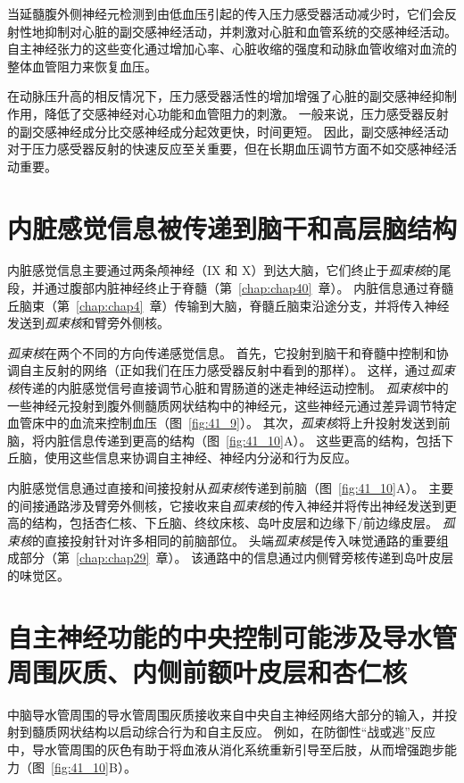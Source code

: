 当延髓腹外侧神经元检测到由低血压引起的传入压力感受器活动减少时，它们会反射性地抑制对心脏的副交感神经活动，并刺激对心脏和血管系统的交感神经活动。
自主神经张力的这些变化通过增加心率、心脏收缩的强度和动脉血管收缩对血流的整体血管阻力来恢复血压。


在动脉压升高的相反情况下，压力感受器活性的增加增强了心脏的副交感神经抑制作用，降低了交感神经对心功能和血管阻力的刺激。
一般来说，压力感受器反射的副交感神经成分比交感神经成分起效更快，时间更短。
因此，副交感神经活动对于压力感受器反射的快速反应至关重要，但在长期血压调节方面不如交感神经活动重要。



\section{内脏感觉信息被传递到脑干和高层脑结构}

内脏感觉信息主要通过两条颅神经（IX 和 X）到达大脑，它们终止于\textit{孤束核}的尾段，并通过腹部内脏神经终止于脊髓（第~\ref{chap:chap40}~章）。
内脏信息通过脊髓丘脑束（第~\ref{chap:chap4}~章）传输到大脑，脊髓丘脑束沿途分支，并将传入神经发送到\textit{孤束核}和臂旁外侧核。


\textit{孤束核}在两个不同的方向传递感觉信息。
首先，它投射到脑干和脊髓中控制和协调自主反射的网络（正如我们在压力感受器反射中看到的那样）。
这样，通过\textit{孤束核}传递的内脏感觉信号直接调节心脏和胃肠道的迷走神经运动控制。
\textit{孤束核}中的一些神经元投射到腹外侧髓质网状结构中的神经元，这些神经元通过差异调节特定血管床中的血流来控制血压（图~\ref{fig:41_9}）。
其次，\textit{孤束核}将上升投射发送到前脑，将内脏信息传递到更高的结构（图~\ref{fig:41_10}A）。
这些更高的结构，包括下丘脑，使用这些信息来协调自主神经、神经内分泌和行为反应。


内脏感觉信息通过直接和间接投射从\textit{孤束核}传递到前脑（图~\ref{fig:41_10}A）。
主要的间接通路涉及臂旁外侧核，它接收来自\textit{孤束核}的传入神经并将传出神经发送到更高的结构，包括杏仁核、下丘脑、终纹床核、岛叶皮层和边缘下/前边缘皮层。
\textit{孤束核}的直接投射针对许多相同的前脑部位。
头端\textit{孤束核}是传入味觉通路的重要组成部分（第~\ref{chap:chap29}~章）。
该通路中的信息通过内侧臂旁核传递到岛叶皮层的味觉区。



\section{自主神经功能的中央控制可能涉及导水管周围灰质、内侧前额叶皮层和杏仁核}

中脑导水管周围的导水管周围灰质接收来自中央自主神经网络大部分的输入，并投射到髓质网状结构以启动综合行为和自主反应。
例如，在防御性“战或逃”反应中，导水管周围的灰色有助于将血液从消化系统重新引导至后肢，从而增强跑步能力（图~\ref{fig:41_10}B）。


